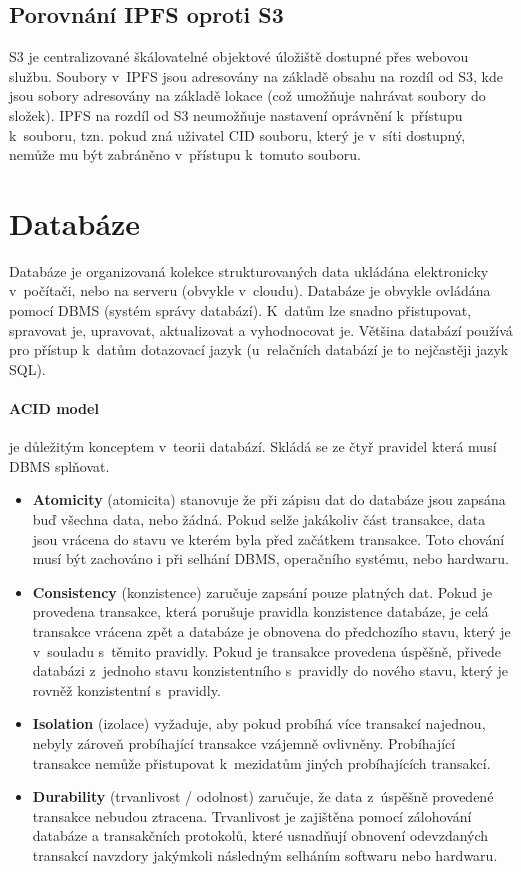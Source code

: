 \documentclass[12pt, a4paper,
  oneside,      %
]{report}
\begin{document}
\subsection{Porovnání IPFS oproti S3}
S3 je centralizované škálovatelné objektové úložiště dostupné přes webovou službu. Soubory v~IPFS jsou adresovány na základě obsahu na rozdíl od S3, kde jsou sobory adresovány na základě lokace (což umožňuje nahrávat soubory do složek). IPFS na rozdíl od S3 neumožňuje nastavení oprávnění k~přístupu k~souboru, tzn. pokud zná uživatel CID souboru, který je v~síti dostupný, nemůže mu být zabráněno v~přístupu k~tomuto souboru. \cite{whatIsS3}

\section{Databáze}
Databáze je organizovaná kolekce strukturovaných data ukládána elektronicky v~počítači, nebo na serveru (obvykle v~cloudu). Databáze je obvykle ovládána pomocí DBMS (systém správy databází). K~datům lze snadno přistupovat, spravovat je, upravovat, aktualizovat a vyhodnocovat je. Většina databází používá pro přístup k~datům dotazovací jazyk (u~relačních databází je to nejčastěji jazyk SQL). \cite{whatIsDatabase}
\paragraph{ACID model} je důležitým konceptem v~teorii databází. Skládá se ze čtyř pravidel která musí DBMS splňovat.
\begin{itemize}
    

\item \textbf{Atomicity} (atomicita) stanovuje že při zápisu dat do databáze jsou zapsána buď všechna data, nebo žádná. Pokud selže jakákoliv část transakce, data jsou vrácena do stavu ve kterém byla před začátkem transakce. Toto chování musí být zachováno i při selhání DBMS, operačního systému, nebo hardwaru.
\item \textbf{Consistency} (konzistence) zaručuje zapsání pouze platných dat. Pokud je provedena transakce, která porušuje pravidla konzistence databáze, je celá transakce vrácena zpět a databáze je obnovena do předchozího stavu, který je v~souladu s~těmito pravidly. Pokud je transakce provedena úspěšně, přivede databázi z~jednoho stavu konzistentního s~pravidly do nového stavu, který je rovněž konzistentní s~pravidly.
\item \textbf{Isolation} (izolace) vyžaduje, aby pokud probíhá více transakcí najednou, nebyly zároveň probíhající transakce vzájemně ovlivněny. Probíhající transakce nemůže přistupovat k~mezidatům jiných probíhajících transakcí.
\item \textbf{Durability} (trvanlivost / odolnost) zaručuje, že data z~úspěšně provedené transakce nebudou ztracena. Trvanlivost je zajištěna pomocí zálohování databáze a transakčních protokolů, které usnadňují obnovení odevzdaných transakcí navzdory jakýmkoli následným selháním softwaru nebo hardwaru. \cite{whatIsACID}
\end{itemize}
\end{document}
